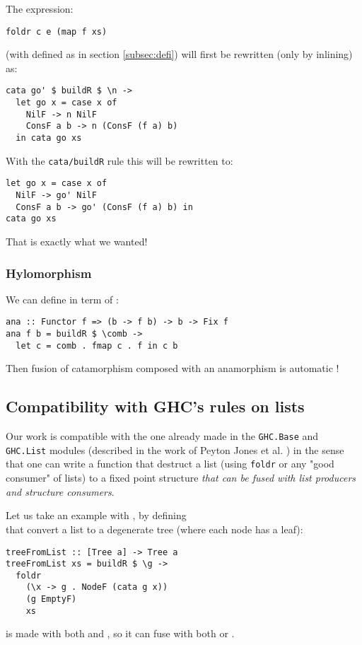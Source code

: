 \noindent The expression:
\begin{verbatim}
foldr c e (map f xs)
\end{verbatim}
(with  defined as in section \ref{subsec:defi}) will first be rewritten (only by inlining) as:
\begin{verbatim}
cata go' $ buildR $ \n ->
  let go x = case x of
    NilF -> n NilF
    ConsF a b -> n (ConsF (f a) b)
  in cata go xs
\end{verbatim}

\noindent With the \verb|cata/buildR| rule this will be rewritten to:
\begin{verbatim}
let go x = case x of
  NilF -> go' NilF
  ConsF a b -> go' (ConsF (f a) b) in
cata go xs
\end{verbatim}
That is exactly what we wanted!

\subsubsection{Hylomorphism}
We can define  in term of :
\begin{verbatim}
ana :: Functor f => (b -> f b) -> b -> Fix f
ana f b = buildR $ \comb ->
  let c = comb . fmap c . f in c b
\end{verbatim}

\noindent Then fusion of catamorphism composed with an anamorphism is automatic !

\subsection{Compatibility with GHC's rules on lists}
Our work is compatible with the one already made in the \verb|GHC.Base| and \verb|GHC.List| modules (described in the work of Peyton Jones et al. \cite{playing-by-the-rules-rewriting-as-a-practical-optimisation-technique-in-ghc} ) in the sense that one can write a function that destruct a list (using \verb|foldr| or any "good consumer" of lists) to a fixed point structure \emph{that can be fused with list producers and structure consumers}.

Let us take an example with , by defining\\  that convert a list to a degenerate tree (where each node has a leaf):
\begin{verbatim}
treeFromList :: [Tree a] -> Tree a
treeFromList xs = buildR $ \g ->
  foldr
    (\x -> g . NodeF (cata g x))
    (g EmptyF)
    xs
\end{verbatim}
\noindent {} is made with both  and , so it can fuse with both  or .

